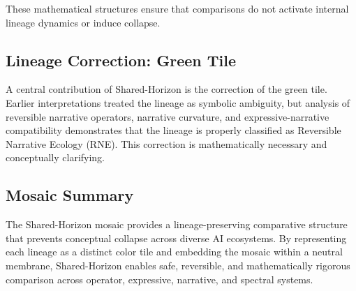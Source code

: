 These mathematical structures ensure that comparisons do not activate internal
lineage dynamics or induce collapse.

\subsection{Lineage Correction: Green Tile}

A central contribution of Shared-Horizon is the correction of the green tile.
Earlier interpretations treated the lineage as symbolic ambiguity, but analysis
of reversible narrative operators, narrative curvature, and expressive-narrative
compatibility demonstrates that the lineage is properly classified as Reversible
Narrative Ecology (RNE). This correction is mathematically necessary and
conceptually clarifying.

\subsection{Mosaic Summary}

The Shared-Horizon mosaic provides a lineage-preserving comparative structure
that prevents conceptual collapse across diverse AI ecosystems. By representing
each lineage as a distinct color tile and embedding the mosaic within a neutral
membrane, Shared-Horizon enables safe, reversible, and mathematically rigorous
comparison across operator, expressive, narrative, and spectral systems.
